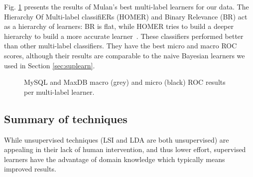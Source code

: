 \documentclass[]{sig-alternate}
\begin{document}
Fig. \ref{fig:mulan} presents the results of Mulan's best multi-label learners for our data. %
The Hierarchy Of Multi-label classifiERs (HOMER) and Binary Relevance (BR) act as a hierarchy of learners: BR is flat, while HOMER tries to build a deeper hierarchy to build a more accurate learner~\cite{mulan}. These classifiers performed better than other multi-label classifiers. They have the best micro and macro ROC scores, although their results are comparable to the naive Bayesian learners we used in Section \ref{sec:suplearn}.

\begin{figure}[ht]
\centering
{}
\label{fig:mulan}
\caption[]{MySQL and MaxDB macro (grey) and micro (black) ROC results per multi-label learner.}
\end{figure}

\subsection{Summary of techniques}
While unsupervised techniques (LSI and LDA are both unsupervised) are appealing in their lack of human intervention, and thus lower effort, supervised learners have the advantage of domain knowledge which typically means improved results.
\end{document}
